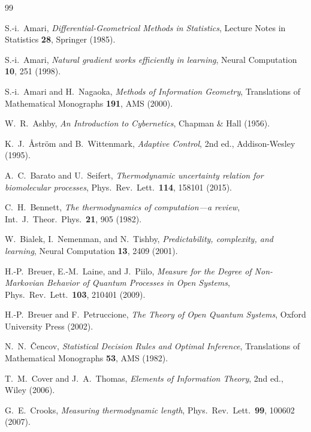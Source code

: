 \documentclass[12pt,a4paper,openany]{book}
\begin{document}
\begin{thebibliography}{99}

S.-i.~Amari,
\emph{Differential-Geometrical Methods in Statistics},
Lecture Notes in Statistics \textbf{28}, Springer (1985).

S.-i.~Amari,
\emph{Natural gradient works efficiently in learning},
Neural Computation \textbf{10}, 251 (1998).

S.-i.~Amari and H.~Nagaoka,
\emph{Methods of Information Geometry},
Translations of Mathematical Monographs \textbf{191},
AMS (2000).

W.~R.~Ashby,
\emph{An Introduction to Cybernetics},
Chapman \& Hall (1956).

K.~J.~\AA{}str\"{o}m and B.~Wittenmark,
\emph{Adaptive Control},
2nd ed., Addison-Wesley (1995).

A.~C.~Barato and U.~Seifert,
\emph{Thermodynamic uncertainty relation for biomolecular
processes},
Phys.\ Rev.\ Lett.\ \textbf{114}, 158101 (2015).

C.~H.~Bennett,
\emph{The thermodynamics of computation---a review},
Int.\ J.\ Theor.\ Phys.\ \textbf{21}, 905 (1982).

W.~Bialek, I.~Nemenman, and N.~Tishby,
\emph{Predictability, complexity, and learning},
Neural Computation \textbf{13}, 2409 (2001).

H.-P.~Breuer, E.-M.~Laine, and J.~Piilo,
\emph{Measure for the Degree of Non-Markovian Behavior of Quantum Processes in Open Systems},
Phys.\ Rev.\ Lett.\ \textbf{103}, 210401 (2009).

H.-P.~Breuer and F.~Petruccione,
\emph{The Theory of Open Quantum Systems},
Oxford University Press (2002).

N.~N.~\v{C}encov,
\emph{Statistical Decision Rules and Optimal Inference},
Translations of Mathematical Monographs \textbf{53},
AMS (1982).

T.~M.~Cover and J.~A.~Thomas,
\emph{Elements of Information Theory},
2nd ed., Wiley (2006).

G.~E.~Crooks,
\emph{Measuring thermodynamic length},
Phys.\ Rev.\ Lett.\ \textbf{99}, 100602 (2007).


\end{thebibliography}
\end{document}
